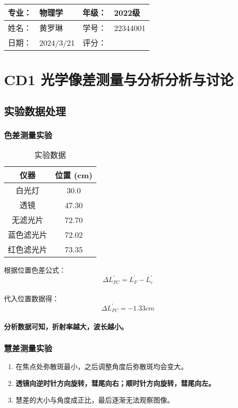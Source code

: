 \documentclass[dvipsnames, svgnames,a4paper,11pt]{article}
\begin{document}
	
	
	\clearpage
	
	\begin{table}
		\renewcommand\arraystretch{1.7}
		\begin{tabularx}{\textwidth}{|X|X|X|X|}
			\hline
			专业：& 物理学 &年级：& 2022级\\
			\hline
			姓名： &  黄罗琳& 学号：&22344001 \\
			\hline
			日期：& 2024/3/21 & 评分： &   \\
			\hline
		\end{tabularx}
	\end{table}
	
	\section{CD1 光学像差测量与分析\quad\heiti 分析与讨论}
	
	\subsection{实验数据处理}
	
	\subsubsection{色差测量实验}
	
		\begin{table}[htbp]
			\centering
			\begin{tabular}{|c|c|}
				\hline
				仪器& 位置 (cm) \\
				\hline
				白光灯 & 30.0 \\
				透镜 & 47.30 \\
				无滤光片 & 72.70 \\
				蓝色滤光片 & 72.02 \\
				红色滤光片 & 73.35 \\
				\hline
			\end{tabular}
			\caption{实验数据}
			\label{tab:positions}
		\end{table}
		根据位置色差公式： $$\Delta L_{FC}^{\prime}=L_F^{\prime}-L_c^{\prime}$$\\
		\indent 代入位置数据得：$$\Delta L_{FC}^{\prime}=-1.33\textit{cm}$$\\
		\indent \textbf{分析数据可知，折射率越大，波长越小。}

	
	\subsubsection{慧差测量实验}
	\begin{enumerate}
		\item 在焦点处弥散斑最小，之后调整角度后弥散斑均会变大。
		\item \textbf{透镜向逆时针方向旋转，彗尾向右；顺时针方向旋转，彗尾向左。}
		\item 慧差的大小与角度成正比，最后逐渐无法观察图像。

	\end{enumerate}
	
\end{document}
